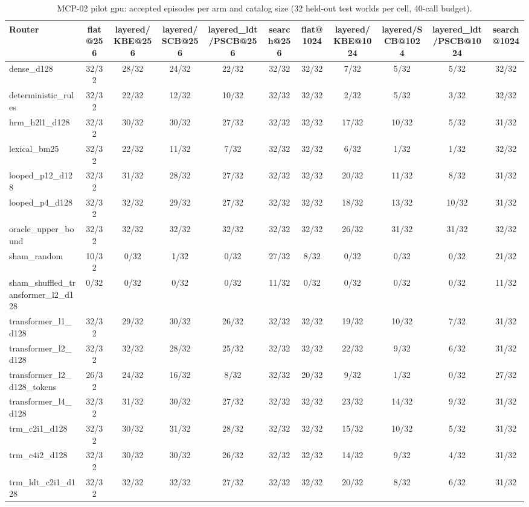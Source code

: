 \begin{table}[t]
\centering
\small
\begin{adjustbox}{max width=\linewidth}
\begin{tabular}{lcccccccccc}
\toprule
Router & flat@256 & layered/KBE@256 & layered/SCB@256 & layered\_ldt/PSCB@256 & search@256 & flat@1024 & layered/KBE@1024 & layered/SCB@1024 & layered\_ldt/PSCB@1024 & search@1024 \\
\midrule
dense\_d128 & 32/32 & 28/32 & 24/32 & 22/32 & 32/32 & 32/32 & 7/32 & 5/32 & 5/32 & 32/32 \\
deterministic\_rules & 32/32 & 22/32 & 12/32 & 10/32 & 32/32 & 32/32 & 2/32 & 5/32 & 3/32 & 32/32 \\
hrm\_h2l1\_d128 & 32/32 & 30/32 & 30/32 & 27/32 & 32/32 & 32/32 & 17/32 & 10/32 & 5/32 & 31/32 \\
lexical\_bm25 & 32/32 & 22/32 & 11/32 & 7/32 & 32/32 & 32/32 & 6/32 & 1/32 & 1/32 & 32/32 \\
looped\_p12\_d128 & 32/32 & 31/32 & 28/32 & 27/32 & 32/32 & 32/32 & 20/32 & 11/32 & 8/32 & 31/32 \\
looped\_p4\_d128 & 32/32 & 32/32 & 29/32 & 27/32 & 32/32 & 32/32 & 18/32 & 13/32 & 10/32 & 31/32 \\
oracle\_upper\_bound & 32/32 & 32/32 & 32/32 & 32/32 & 32/32 & 32/32 & 26/32 & 31/32 & 31/32 & 32/32 \\
sham\_random & 10/32 & 0/32 & 1/32 & 0/32 & 27/32 & 8/32 & 0/32 & 0/32 & 0/32 & 21/32 \\
sham\_shuffled\_transformer\_l2\_d128 & 0/32 & 0/32 & 0/32 & 0/32 & 11/32 & 0/32 & 0/32 & 0/32 & 0/32 & 11/32 \\
transformer\_l1\_d128 & 32/32 & 29/32 & 30/32 & 26/32 & 32/32 & 32/32 & 19/32 & 10/32 & 7/32 & 31/32 \\
transformer\_l2\_d128 & 32/32 & 32/32 & 28/32 & 25/32 & 32/32 & 32/32 & 22/32 & 9/32 & 6/32 & 31/32 \\
transformer\_l2\_d128\_tokens & 26/32 & 24/32 & 16/32 & 8/32 & 32/32 & 20/32 & 9/32 & 1/32 & 0/32 & 27/32 \\
transformer\_l4\_d128 & 32/32 & 31/32 & 30/32 & 27/32 & 32/32 & 32/32 & 23/32 & 14/32 & 9/32 & 31/32 \\
trm\_c2i1\_d128 & 32/32 & 30/32 & 31/32 & 28/32 & 32/32 & 32/32 & 15/32 & 10/32 & 5/32 & 31/32 \\
trm\_c4i2\_d128 & 32/32 & 30/32 & 30/32 & 26/32 & 32/32 & 32/32 & 14/32 & 9/32 & 4/32 & 31/32 \\
trm\_ldt\_c2i1\_d128 & 32/32 & 32/32 & 32/32 & 27/32 & 32/32 & 32/32 & 20/32 & 8/32 & 6/32 & 31/32 \\
\bottomrule
\end{tabular}
\end{adjustbox}
\caption{MCP-02 pilot gpu: accepted episodes per arm and catalog size (32 held-out test worlds per cell, 40-call budget).}
\label{tab:mcp02-pilot_gpu-success}
\end{table}
